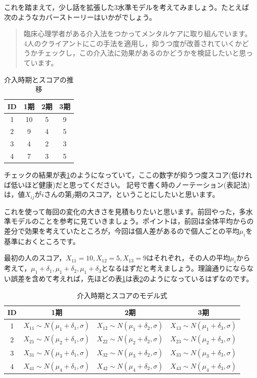 \documentclass{ltjsbook}
\begin{document}
これを踏まえて，少し話を拡張した3水準モデルを考えてみましょう。たとえば次のようなカバーストーリーはいかがでしょう。
\begin{quote}
	臨床心理学者がある介入法をつかってメンタルケアに取り組んでいます。
	4人のクライアントにこの手法を適用し，抑うつ度が改善されていくかどうかチェックし，この介入法に効果があるのかどうかを検証したいと思っています。
\end{quote}
\begin{table}[ht]
	\centering
	\caption{介入時期とスコアの推移}
	\begin{tabular}{cccc}
		ID & 1期 & 2期 & 3期 \\\hline
		1  & 10 & 5  & 9  \\
		2  & 9  & 4  & 5  \\
		3  & 4  & 2  & 3  \\
		4  & 7  & 3  & 5  \\\hline
	\end{tabular}
	\label{tbl:22_02}
\end{table}
チェックの結果が表\ref{tbl:22_02}のようになっていて，ここの数字が抑うつ度スコア(低ければ低いほど健康)だと思ってください。
記号で書く時のノーテーション(表記法)は，値$X_{ij}$が$i$さんの第$j$期のスコア，ということにしたいと思います。

これを使って毎回の変化の大きさを見積もりたいと思います。前回やった，多水準モデルのことを参考に見ていきましょう。ポイントは，前回は全体平均からの差分で効果を考えていたところが，今回は個人差があるので個人ごとの平均$\mu_i$を基準におくところです。

最初の人のスコア，$X_{11}=10,X_{12}=5,X_{13}=9$はそれぞれ，その人の平均$\mu_i$から考えて，$\mu_1+\delta_1,\mu_1+\delta_2,\mu_1+\delta_3$となるはずだと考えましょう。理論通りにならない誤差を含めて考えれば，先ほどの表\ref{tbl:22_02}は表\ref{tbl:22_03}のようになっているはずなのです。
\begin{table}[ht]
	\centering
	\caption{介入時期とスコアのモデル式}
	\begin{tabular}{cccc}
		ID & 1期                                    & 2期                                    & 3期                                    \\\hline
		1  & $X_{11}\sim N(\mu_1+\delta_1,\sigma)$ & $X_{12}\sim N(\mu_1+\delta_2,\sigma)$ & $X_{13}\sim N(\mu_1+\delta_3,\sigma)$ \\
		2  & $X_{21}\sim N(\mu_2+\delta_1,\sigma)$ & $X_{22}\sim N(\mu_2+\delta_2,\sigma)$ & $X_{23}\sim N(\mu_2+\delta_3,\sigma)$ \\
		3  & $X_{31}\sim N(\mu_3+\delta_1,\sigma)$ & $X_{32}\sim N(\mu_3+\delta_2,\sigma)$ & $X_{33}\sim N(\mu_3+\delta_3,\sigma)$ \\
		4  & $X_{41}\sim N(\mu_4+\delta_1,\sigma)$ & $X_{42}\sim N(\mu_4+\delta_2,\sigma)$ & $X_{43}\sim N(\mu_4+\delta_3,\sigma)$ \\\hline
	\end{tabular}
	\label{tbl:22_03}
\end{table}
\end{document}
